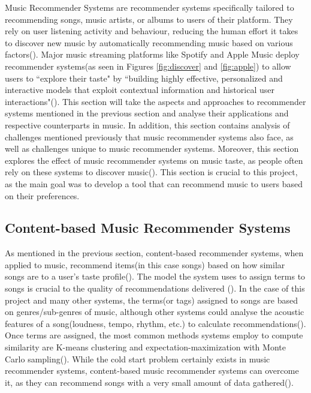 \documentclass{l4proj}
\begin{document}
Music Recommender Systems are recommender systems specifically tailored to recommending songs, music artists, or albums to users of their platform. They rely on user listening activity and behaviour, reducing the human effort it takes to discover new music by automatically recommending music based on various factors(\cite{Paul_Kundu_2019}). Major music streaming platforms like Spotify and Apple Music deploy recommender systems(as seen in Figures \ref{fig:discover} and \ref{fig:apple}) to allow users to ``explore their taste" by ``building highly effective, personalized and interactive models that exploit contextual information and historical user interactions"(\cite{SpotifyResearch}). This section will take the aspects and approaches to recommender systems mentioned in the previous section and analyse their applications and respective counterparts in music. In addition, this section contains analysis of challenges mentioned previously that music recommender systems also face, as well as challenges unique to music recommender systems. Moreover, this section explores the effect of music recommender systems on music taste, as people often rely on these systems to discover music(\cite{Karakayali_Kostem_Galip_2017}). This section is crucial to this project, as the main goal was to develop a tool that can recommend music to users based on their preferences.
\subsection{Content-based Music Recommender Systems}
As mentioned in the previous section, content-based recommender systems, when applied to music, recommend items(in this case songs) based on how similar songs are to a user's taste profile(\cite{Paul_Kundu_2019}). The model the system uses to assign terms to songs is crucial to the quality of recommendations delivered (\cite{Paul_Kundu_2019}). In the case of this project and many other systems, the terms(or tags) assigned to songs are based on genres/sub-genres of music, although other systems could analyse the acoustic features of a song(loudness, tempo, rhythm, etc.) to calculate recommendations(\cite{Paul_Kundu_2019}). Once terms are assigned, the most common methods systems employ to compute similarity are K-means clustering and expectation-maximization with Monte Carlo sampling(\cite{Paul_Kundu_2019}). While the cold start problem certainly exists in music recommender systems, content-based music recommender systems can overcome it, as they can recommend songs with a very small amount of data gathered(\cite{Paul_Kundu_2019}).
\end{document}
